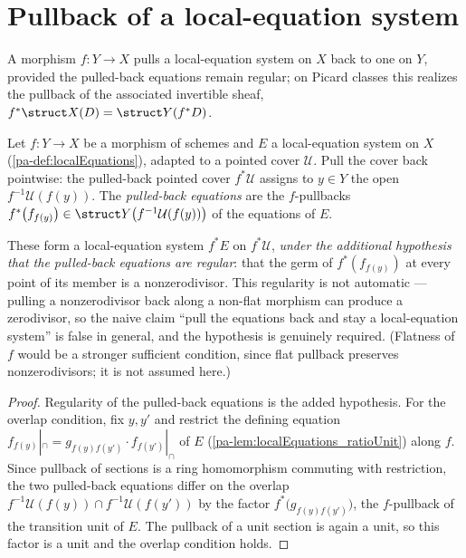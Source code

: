 \section{Pullback of a local-equation system}

A morphism \(f \colon Y \to X\) pulls a local-equation system on \(X\) back to one on \(Y\),
provided the pulled-back equations remain regular; on Picard classes this realizes the pullback of
the associated invertible sheaf, \(f^{*}\struct X(D) = \struct Y(f^{*}D)\).

\begin{definition}
  \label{pa-def:localEquations_pullback}
  \leanok

  Let \(f \colon Y \to X\) be a morphism of schemes and \(E\) a local-equation system on \(X\)
  (\ref{pa-def:localEquations}), adapted to a pointed cover \(\mathcal U\). Pull the cover back
  pointwise: the pulled-back pointed cover \(f^{*}\mathcal U\) assigns to \(y \in Y\) the open
  \(f^{-1}\mathcal U(f(y))\). The \emph{pulled-back equations} are the \(f\)-pullbacks
  \(f^{*}\bigl(f_{f(y)}\bigr) \in \struct Y\bigl(f^{-1}\mathcal U(f(y))\bigr)\) of the equations of
  \(E\).

  These form a local-equation system \(f^{*}E\) on \(f^{*}\mathcal U\), \emph{under the additional
  hypothesis that the pulled-back equations are regular}: that the germ of \(f^{*}(f_{f(y)})\) at
  every point of its member is a nonzerodivisor. This regularity is not automatic --- pulling a
  nonzerodivisor back along a non-flat morphism can produce a zerodivisor, so the naive claim
  ``pull the equations back and stay a local-equation system'' is false in general, and the
  hypothesis is genuinely required. (Flatness of \(f\) would be a stronger sufficient condition,
  since flat pullback preserves nonzerodivisors; it is not assumed here.)
\end{definition}
\begin{proof}
  \leanok
  Regularity of the pulled-back equations is the added hypothesis. For the overlap condition, fix
  \(y, y'\) and restrict the defining equation
  \(f_{f(y)}|_{\cap} = g_{f(y)f(y')}\cdot f_{f(y')}|_{\cap}\) of \(E\)
  (\ref{pa-lem:localEquations_ratioUnit}) along \(f\). Since pullback of sections is a ring
  homomorphism commuting with restriction, the two pulled-back equations differ on the overlap
  \(f^{-1}\mathcal U(f(y)) \cap f^{-1}\mathcal U(f(y'))\) by the factor
  \(f^{*}\bigl(g_{f(y)f(y')}\bigr)\), the \(f\)-pullback of the transition unit of \(E\). The
  pullback of a unit section is again a unit, so this factor is a unit and the overlap condition
  holds.
\end{proof}

